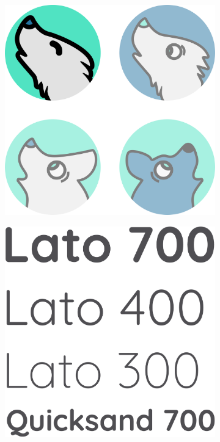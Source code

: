 \documentclass[12pt,numbers=noenddot,parskip,bibliography=totocnumbered,listof=totocnumbered,draft]{scrreprt}
\begin{document}
\begin{figure}
\begin{subfigure}[t]{0.45\textwidth}%
\centering
\includegraphics[width=\linewidth]{icons.png}
\caption{}
\label{icons}
\end{subfigure}%
\hfill
\begin{subfigure}[t]{0.45\textwidth}%
\centering
\includegraphics[width=\linewidth]{fonts.png}

\end{subfigure}
\end{figure}
\end{document}

